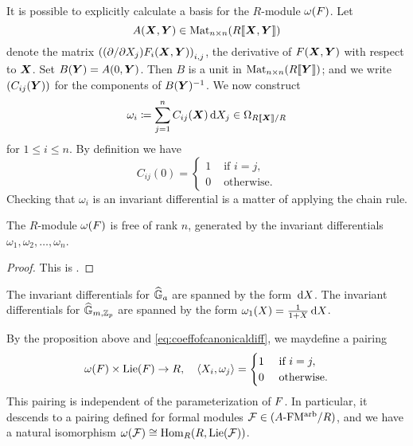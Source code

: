 \documentclass[../main.tex]{subfiles}
\begin{document}
It is possible to explicitly calculate a basis for the $R$-module
$\omega({F})$. Let 
$$A(\boldsymbol{X}, \boldsymbol{Y}) \in \operatorname{Mat}_{n \times n} (R\llbracket \boldsymbol{X}, \boldsymbol{Y} \rrbracket)$$ 
denote the matrix $\left((\partial/\partial X_j)F_i (\boldsymbol{X},\boldsymbol{Y})\right)_{i,j}$,
the derivative of ${F}(\boldsymbol{X},\boldsymbol{Y})$ with respect to $\boldsymbol{X}$. Set 
$B(\boldsymbol{Y}) = A(0,\boldsymbol{Y})$. Then $B$ is a unit in $\operatorname{Mat}_{n \times n} (R\llbracket \boldsymbol{Y} \rrbracket)$; 
and we write $(C_{ij}(\boldsymbol{Y}))$ for the components of 
$B(\boldsymbol{Y})^{-1}$. We now construct 
$$\omega_{i} \coloneqq \sum_{j=1}^n C_{ij}(\boldsymbol{X}) \, \mathrm{d} X_j \in \Omega_{R\llbracket \boldsymbol{X} \rrbracket/R}$$ 
for $1 \leq i \leq n$. By definition we have 
\begin{equation}\label{eq:coeffofcanonicaldiff}
  C_{ij}(0) = \begin{cases}
    1 &\text{ if }i = j,\\
    0 &\text{ otherwise.}
  \end{cases}
\end{equation}
Checking that $\omega_{i}$ is an invariant differential is a matter of 
applying the chain rule. 
\begin{prop}
    The $R$-module $\omega({F})$ is free of rank $n$, generated by the invariant
    differentials $\omega_{1}, \omega_{2}, \dots, \omega_{n}$.
\begin{proof}
  This is \cite[Proposition 1.1]{honda1970formalgroups}. 
\end{proof}
\end{prop}
\begin{xpl}
  The invariant differentials for $\widehat{\mathbb{G}}_a$ are spanned by the form $\, \mathrm{d} X$. 
  The invariant differentials for $\widehat{\mathbb{G}}_{m, \mathbb{Z}_p}$ are spanned by the form 
  $\omega_1(X) = \frac 1{1+X} \, \mathrm{d} X$.
\end{xpl}
By the proposition above and \eqref{eq:coeffofcanonicaldiff}, we maydefine a pairing
\begin{equation*}
  \omega({F}) \times \operatorname{Lie}({F}) \to R, \quad \langle X_i, \omega_j \rangle =
  \begin{cases}
    1 &\text{ if } i = j,\\
    0 &\text{ otherwise.}
  \end{cases}
\end{equation*}
This pairing is independent of the parameterization of ${F}$. In particular, it
descends to a pairing defined for formal modules $\mathcal{F} \in {({A}\textnormal-\allowbreak\mathrm{FM^{arb}}/{R})}$, and
we have a natural isomorphism $\omega(\mathcal{F}) \cong \operatorname{Hom}_R(R, \operatorname{Lie}(\mathcal{F}))$.
\end{document}
